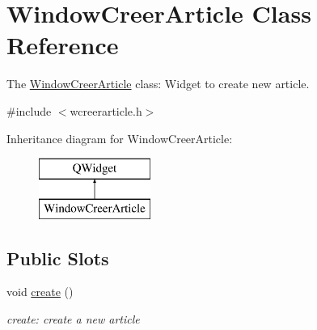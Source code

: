 \hypertarget{class_window_creer_article}{}\section{Window\+Creer\+Article Class Reference}
\label{class_window_creer_article}


The \hyperlink{class_window_creer_article}{Window\+Creer\+Article} class\+: Widget to create new article.  




{\ttfamily \#include $<$wcreerarticle.\+h$>$}

Inheritance diagram for Window\+Creer\+Article\+:\begin{figure}[H]
\begin{center}
\leavevmode
\includegraphics[height=2.000000cm]{class_window_creer_article}
\end{center}
\end{figure}
\subsection*{Public Slots}
\begin{DoxyCompactItemize}
\item 
\mbox{\label{class_window_creer_article_a084c06c7c51d4383018ff3d43a081b80}} 
void \hyperlink{class_window_creer_article_a084c06c7c51d4383018ff3d43a081b80}{create} ()
\begin{DoxyCompactList}\small\item\em create\+: create a new article \end{DoxyCompactList}\end{DoxyCompactItemize}
